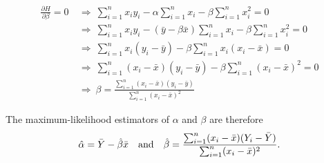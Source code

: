 \begin{align*}
\frac{\partial H}{\partial\beta} =0
	& \ \Rightarrow\  \sum_{i=1}^n x_i y_i - \alpha\sum_{i=1}^n x_i -\beta\sum_{i=1}^n x_i^2 = 0 \\
	& \ \Rightarrow\  \sum_{i=1}^n x_i y_i - (\bar{y}-\beta\bar{x})\sum_{i=1}^n x_i -\beta\sum_{i=1}^n x_i^2 = 0 \\
	& \ \Rightarrow\  \sum_{i=1}^n x_i(y_i-\bar{y}) - \beta\sum_{i=1}^n x_i(x_i-\bar{x}) = 0 \\
	& \ \Rightarrow\  \sum_{i=1}^n (x_i-\bar{x})(y_i-\bar{y}) - \beta\sum_{i=1}^n (x_i-\bar{x})^2 = 0 \\
	& \ \Rightarrow\  \beta = \frac{\sum_{i=1}^n (x_i-\bar{x})(y_i-\bar{y})}{\sum_{i=1}^n (x_i-\bar{x})^2}
\end{align*}

The maximum-likelihood estimators of $\alpha$ and $\beta$ are therefore
\[
\hat{\alpha} = \bar{Y}-\hat{\beta}\bar{x}
\text{\quad and\quad}
\hat{\beta} = \frac{\sum_{i=1}^n (x_i-\bar{x})(Y_i-\bar{Y})}{\sum_{i=1}^n (x_i-\bar{x})^2}.
\]



